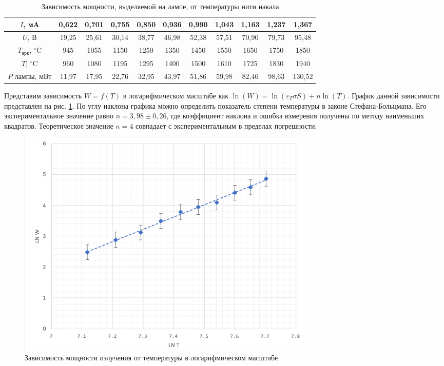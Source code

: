     \begin{table}[h]
    \label{boltstab}
    \centering
    \begin{center}
    \caption{Зависимость мощности, выделяемой на лампе, от температуры нити накала}
    \end{center}
    \begin{tabular}{|c||c|c|c|c|c|c|c|c|c|c|}
 \hline
 $I$, мA & 0,622 & 0,701 & 0,755 & 0,850 & 0,936 & 0,990 & 1,043 & 1,163 & 1,237 & 1,367
\\
\hline
$U$, В & 19,25 & 25,61 & 30,14 & 38,77 & 46,98 & 52,38 & 57,51 & 70,90 & 79,73 & 95,48
 \\
 \hline
 $T_\text{ярк}$, $^{\circ}$C & 945 & 1055 & 1150 & 1250 & 1350 & 1450 & 1550 & 1650 & 1750 & 1850
 \\
 \hline
 $T$, $^{\circ}$C & 960 & 1080 & 1195 & 1295 & 1400 & 1500 & 1610 & 1725 & 1830 & 1940
\\
  \hline
 $P$ лампы, мВт & 11,97 & 17,95 & 22,76 & 32,95 & 43,97 & 51,86 & 59,98 & 82,46 & 98,63 & 130,52
 \\
 \hline
\end{tabular}
\end{table}   

Представим зависимость $W=f(T)$ в логарифмическом масштабе как $\ln(W) = \ln(\varepsilon_T \sigma S) + n \ln(T)$. График данной зависимости представлен на рис. \ref{graph}. По углу наклона графика можно определить показатель степени температуры в законе Стефана-Больцмана. Его экспериментальное значение равно $n = 3,98 \pm 0,26$, где коэффициент наклона и ошибка измерения получены по методу наименьших квадратов. Теоретическое значение $n = 4$ совпадает с экспериментальным в пределах погрешности. 

\begin{figure}
    \centering
    \includegraphics[width=0.7\textwidth]{img/graph.png}
    \caption{Зависимость мощности излучения от температуры в логарифмическом масштабе}
    \label{graph}
\end{figure}

